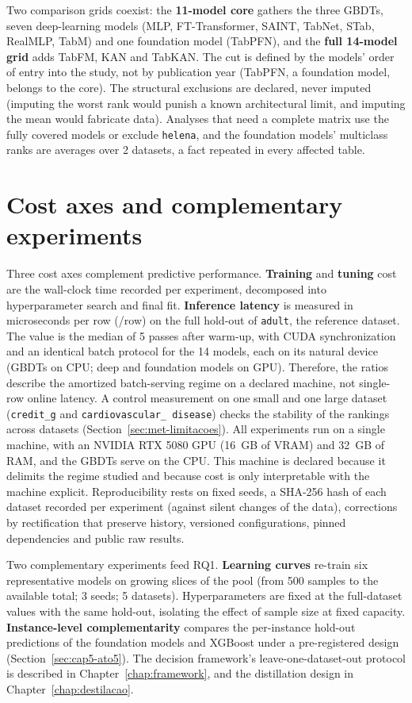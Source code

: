 Two comparison grids coexist: the \textbf{11-model core} gathers
the three GBDTs, seven deep-learning models (MLP, FT-Transformer,
SAINT, TabNet, STab, RealMLP, TabM) and one foundation model
(TabPFN), and the \textbf{full 14-model grid} adds TabFM, KAN and
TabKAN. The cut is defined by the models' order of entry into the
study, not by publication year (TabPFN, a foundation model, belongs
to the core). The structural exclusions are declared, never imputed
(imputing the worst rank would punish a known architectural limit,
and imputing the mean would fabricate data). Analyses that need a
complete matrix use the fully covered models or exclude
\texttt{helena}, and the foundation models' multiclass ranks are
averages over 2 datasets, a fact repeated in every affected table.

\section{Cost axes and complementary experiments}
\label{sec:met-custo}
\label{sec:met-reprodutibilidade}

Three cost axes complement predictive performance.
\textbf{Training} and \textbf{tuning} cost are the wall-clock time
recorded per experiment, decomposed into hyperparameter search and
final fit. \textbf{Inference latency} is measured in microseconds
per row (\us/row) on the full hold-out of \texttt{adult}, the
reference dataset. The value is the median of 5 passes after
warm-up, with CUDA synchronization and an identical batch protocol
for the 14 models, each on its natural device (GBDTs on CPU; deep
and foundation models on GPU). Therefore, the ratios describe the
amortized batch-serving regime on a declared machine, not single-row
online latency. A control measurement on one small and one large
dataset (\texttt{credit\_g} and \texttt{cardiovascular\_\allowbreak
disease}) checks the stability of the rankings across datasets
(Section~\ref{sec:met-limitacoes}). All experiments run on a single
machine, with an NVIDIA RTX 5080 GPU (16~GB of VRAM) and 32~GB of
RAM, and the GBDTs serve on the CPU. This machine is declared
because it delimits the regime studied and because cost is only
interpretable with the machine explicit. Reproducibility rests on
fixed seeds, a SHA-256 hash of each dataset recorded per experiment
(against silent changes of the data), corrections by rectification
that preserve history, versioned configurations, pinned
dependencies and public raw results.

Two complementary experiments feed RQ1. \textbf{Learning curves}
re-train six representative models on growing slices of the pool
(from 500 samples to the available total; 3 seeds; 5 datasets).
Hyperparameters are fixed at the full-dataset values with the same
hold-out, isolating the effect of sample size at fixed
capacity. \textbf{Instance-level complementarity} compares the
per-instance hold-out predictions of the foundation models and
XGBoost under a pre-registered design
(Section~\ref{sec:cap5-ato5}). The decision framework's
leave-one-dataset-out protocol is described in
Chapter~\ref{chap:framework}, and the distillation design in
Chapter~\ref{chap:destilacao}.

